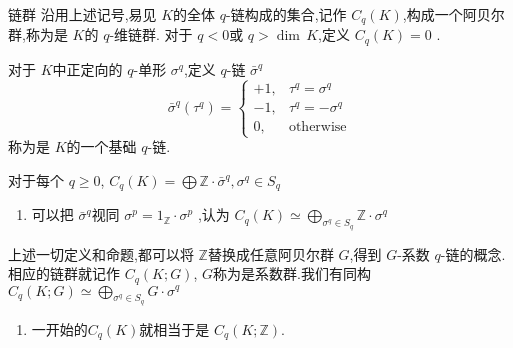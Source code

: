 \documentclass[../../几何与拓扑.tex]{subfiles}
\begin{document}
\begin{definition}{链群}
    沿用上述记号,易见 \(  K  \)的全体 \(  q  \)-链构成的集合,记作 \(  C_{q}\left( K \right)   \),构成一个阿贝尔群,称为是 \(  K  \)的 \(  q  \)-维链群.
         对于 \(  q<0  \)或 \(  q> \operatorname{dim}\,K  \),定义 \(  C_{q}\left( K \right)= 0   \)   .
\end{definition}


\begin{definition}
    对于 \(  K  \)中正定向的 \(  q  \)-单形 \(   \sigma ^{q}  \),定义 \(  q  \)-链 \(   \bar{\sigma}^{q}  \) \[
     \bar{\sigma}^{q}\left( \tau ^{q} \right) =  \begin{cases} + 1,& \tau ^{q}=  \sigma ^{q}\\ 
      -1,& \tau ^{q}= - \sigma ^{q}\\ 
       0, & \text{otherwise} \end{cases}  
    \]     称为是 \(  K  \)的一个基础 \(  q  \)-链.  
\end{definition}

\begin{proposition}
    对于每个 \(  q \ge 0  \), \(  C_{q}\left( K  \right) = \bigoplus \mathbb{Z} \cdot  \bar{\sigma}^{q}, \sigma ^{q} \in S_{q}   \)  
\end{proposition}

\begin{remark}
    \begin{enumerate}
        \item 可以把 \(   \bar{\sigma}^{q}  \)视同 \(   \sigma ^{p}=  1_{\mathbb{Z} }\cdot  \sigma ^{p}  \)  ,认为 \(  C_{q}\left( K \right)\simeq  \bigoplus_{ \sigma ^{q} \in  S_{q}} \mathbb{Z} \cdot   \sigma ^{q}   \) 
    \end{enumerate}
    
\end{remark}

\begin{definition}
    上述一切定义和命题,都可以将 \(  \mathbb{Z}   \)替换成任意阿贝尔群 \(  G  \),得到 \(  G  \)-系数 \(  q  \)-链的概念.
    相应的链群就记作 \(  C_{q}\left( K;G \right)   \), \(  G  \)称为是系数群.我们有同构 \(  C_{q}\left( K;G \right)\simeq  \bigoplus _{ \sigma ^{q}\in S_{q}}G \cdot  \sigma ^{q}   \)        
\end{definition}

\begin{remark}
    \begin{enumerate}
        \item 一开始的\(  C_{q}\left( K \right)   \)就相当于是 \(  C_{q}\left( K;\mathbb{Z}  \right)   \).  
    \end{enumerate}
    
\end{remark}
\end{document}
